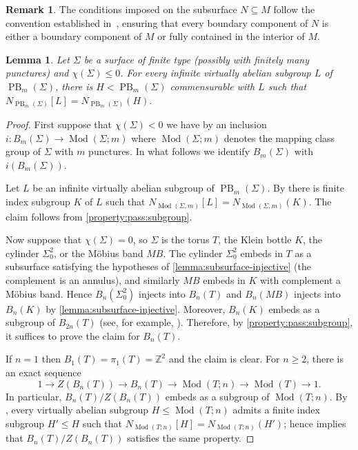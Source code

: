 \documentclass[a4paper,12pt,leqno]{amsart}
\newtheorem{lemma}[theorem]{Lemma}
\theoremstyle{definition}
\newtheorem{remark}{Remark}
\newcommand{\Z}{\mathbb{Z}}
\DeclareMathOperator{\mcg}{Mod}
\DeclareMathOperator{\pb}{PB}
\begin{document}
\begin{remark}
The conditions imposed on the subsurface \( N \subseteq M \) follow the convention established in~\cite{Paris:Rolfsen}, ensuring that every boundary component of \( N \) is either a boundary component of \( M \) or fully contained in the interior of \( M \).
\end{remark}


\begin{lemma}\label{commen:equal:norma}Let $\Sigma$ be a surface of finite type (possibly with finitely many punctures) and \(\chi(\Sigma) \leq 0\).
    For every infinite virtually abelian subgroup \(L\) of \(\pb_{m}(\Sigma)\), there is $H<\pb_{m}(\Sigma)$ commensurable with $L$ such that $N_{\pb_{m}(\Sigma)}[L]=N_{\pb_{m}(\Sigma)}(H).$
\end{lemma}
\begin{proof}
First suppose that \(\chi(\Sigma) < 0\) we have by \cite[Section 2.4]{MR3382024} an inclusion $i\colon B_m(\Sigma) \to \mcg(\Sigma; m)$ where $\mcg(\Sigma;m)$ denotes the
mapping class group of $\Sigma$ with $m$ punctures. In what follows we identify $B_m(\Sigma)$ with $i(B_m(\Sigma))$.



Let $L$ be an infinite virtually abelian subgroup  of \(\pb_{m}(\Sigma)\). By \cite[Proposition 4.8]{MR3767218}\cite[Proposition 5.9]{Nucinkis:Petrosyan}\cite[Theorem 4.10] {Rita:Porfirio:Luis} there is finite index subgroup $K$ of $L$ such that $N_{\mcg(\Sigma,m)}[L]=N_{\mcg(\Sigma,m)}(K)$. The claim follows from \cref{property:pass:subgroup}.


Now suppose that $\chi(\Sigma) = 0$, so $\Sigma$ is the torus $T$, the
Klein bottle $K$, the cylinder $\Sigma_{0}^2$, or the Möbius band $MB$.
The cylinder $\Sigma_{0}^2$ embeds in $T$ as a subsurface satisfying the
hypotheses of \cref{lemma:subsurface-injective} (the complement is an
annulus), and similarly $MB$ embeds in $K$ with complement a Möbius band.
Hence $B_n(\Sigma_{0}^2)$ injects into $B_n(T)$ and $B_n(MB)$ injects
into $B_n(K)$ by \cref{lemma:subsurface-injective}. Moreover, $B_n(K)$
embeds as a subgroup of $B_{2n}(T)$ (see, for example,
\cite{MR2927811}). Therefore, by \cref{property:pass:subgroup}, it
suffices to prove the claim for $B_n(T)$.

If $n=1$ then $B_1(T)=\pi_1(T)=\Z^2$ and the claim is clear. For $n \geq 2$, there is an exact sequence \cite{FM12}
\[
  1 \to Z(B_n(T)) \to B_n(T) \to \mcg(T;n) \to \mcg(T) \to 1.
\]
In particular, $B_n(T)/Z(B_n(T))$ embeds as a subgroup of $\mcg(T;n)$. By
\cite[Theorem 4.10]{Rita:Porfirio:Luis}, every virtually abelian subgroup $H \leq \mcg(T;n)$ admits a
finite index subgroup $H' \leq H$ such that
$N_{\mcg(T;n)}[H] = N_{\mcg(T;n)}(H')$; hence \cite[Lemma 4.16]{Rita:Porfirio:Luis}
implies that $B_n(T)/Z(B_n(T))$ satisfies the same property.


\end{proof}
\end{document}

